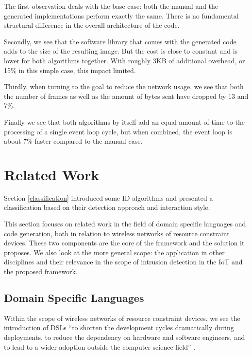 \documentclass[conference]{IEEEtran}
\begin{document}
The first observation deals with the base case: both the manual and the
generated implementations perform exactly the same. There is no fundamental
structural difference in the overall architecture of the code.

Secondly, we see that the software library that comes with the generated code
adds to the size of the resulting image. But the cost is close to constant and
is lower for both algorithms together. With roughly 3KB of additional overhead,
or 15\% in this simple case, this impact limited.

Thirdly, when turning to the goal to reduce the network usage, we see that both
the number of frames as well as the amount of bytes sent have dropped by 13 and
7\%.

Finally we see that both algorithms by itself add an equal amount of time to
the processing of a single event loop cycle, but when combined, the event loop
is about 7\% faster compared to the manual case.

\section{Related Work}
\label{related}

Section \ref{classification} introduced some ID
algorithms \cite{ganeriwal2008reputation,mishra2004intrusion,krontiris2009cooperative}
and presented a classification \cite{mishra2004intrusion,ioannis2007towards,alrajeh2013intrusion}
based on their detection approach and interaction style.

This section focuses on related work in the field of domain specific languages
and code generation, both in relation to wireless networks of resource
constraint devices. These two components are the core of the \NAME framework
and the solution it proposes. We also look at the more general scope: the
application in other disciplines and their relevance in the scope of intrusion
detection in the IoT and the proposed \NAME framework.

\subsection{Domain Specific Languages}

Within the scope of wireless networks of resource constraint devices, we see
the introduction of DSLs \enquote{to shorten the development cycles
dramatically during deployments, to reduce the dependency on hardware and
software engineers, and to lead to a wider adoption outside the computer
science field} \cite{sadilek2008domain,naumowicz2009prototyping}.
\end{document}
